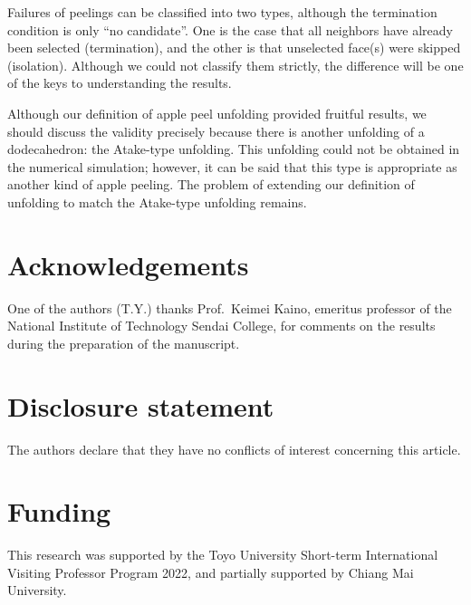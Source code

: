 \documentclass[12pt]{article}
\theoremstyle{plain}
\theoremstyle{definition}
\theoremstyle{remark}
\begin{document}
Failures of peelings can be classified into two types, although the
termination condition is only ``no candidate''.
One is the case that all neighbors have already been selected
(termination), and the other is that unselected face(s) were skipped
(isolation).
Although we could not classify them strictly, the difference will be one
of the keys to understanding the results.

Although our definition of apple peel unfolding provided fruitful results,
we should discuss the validity precisely because there is another unfolding
of a dodecahedron: the Atake-type unfolding.
This unfolding could not be obtained in the numerical simulation; however,
it can be said that this type is appropriate as another kind of apple
peeling.
The problem of extending our definition of unfolding to match the
Atake-type unfolding remains.

\section*{Acknowledgements}

One of the authors (T.Y.) thanks Prof.\ Keimei Kaino, emeritus professor
of the National Institute of Technology Sendai College, for comments on
the results during the preparation of the manuscript.

\section*{Disclosure statement}

The authors declare that they have no conflicts of interest concerning this
article.

\section*{Funding}

This research was supported by the Toyo University Short-term
International Visiting Professor Program 2022, and partially supported by
Chiang Mai University.
\end{document}
